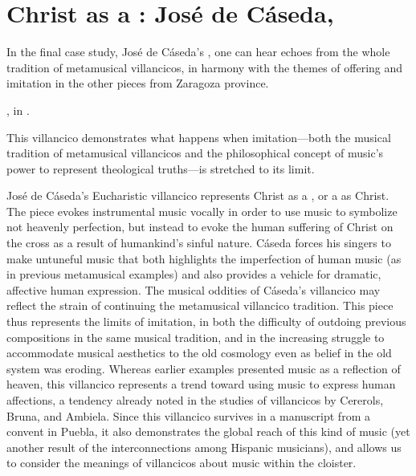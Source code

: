 
\section{Christ as a : José de Cáseda, }

In the final case study, José de Cáseda's , one can
hear echoes from the whole tradition of metamusical villancicos, in harmony
with the themes of offering and imitation in the other pieces from Zaragoza
province.%
\begin{Footnote} 
    , in \autocite{Cashner:WLSCM32}.
\end{Footnote}
This villancico demonstrates what happens when imitation---both the musical
tradition of metamusical villancicos and the philosophical concept of music's
power to represent theological truths---is stretched to its limit.

José de Cáseda's Eucharistic villancico  represents
Christ as a , or a  as Christ.
The piece evokes instrumental music vocally in order to use music to symbolize
not heavenly perfection, but instead to evoke the human suffering of Christ on
the cross as a result of humankind's sinful nature.
Cáseda forces his singers to make untuneful music that both highlights the
imperfection of human music (as in previous metamusical examples) and also
provides a vehicle for dramatic, affective human expression. 
The musical oddities of Cáseda's villancico may reflect the strain of
continuing the metamusical villancico tradition.
This piece thus represents the limits of imitation, in both the difficulty of
outdoing previous compositions in the same musical tradition, and in the
increasing struggle to accommodate musical aesthetics to the old cosmology even
as belief in the old system was eroding.
Whereas earlier examples presented music as a reflection of heaven, this
villancico represents a trend toward using music to express human affections, a
tendency already noted in the studies of villancicos by Cererols, Bruna, and
Ambiela.
Since this villancico survives in a manuscript from a convent in Puebla, it
also demonstrates the global reach of this kind of music (yet another result of
the interconnections among Hispanic musicians), and allows us to consider the
meanings of villancicos about music within the cloister.

